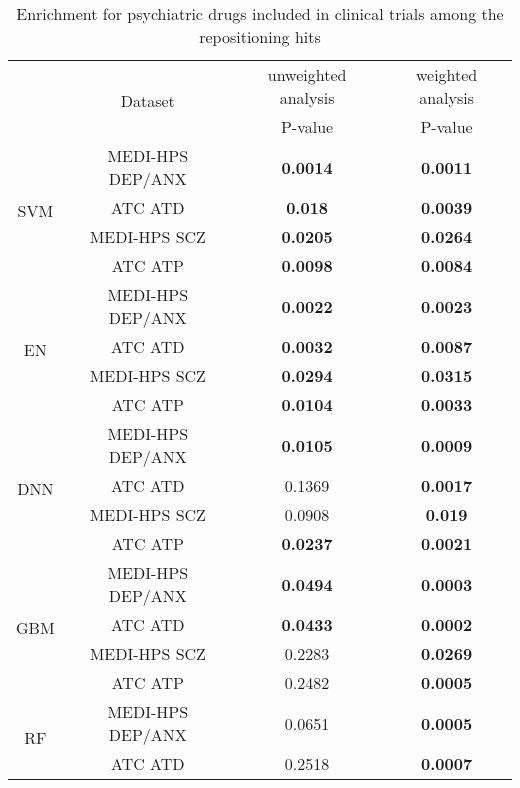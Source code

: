       \begin{table}[htbp]
        \centering
        \caption{Enrichment for psychiatric drugs included in clinical trials among the repositioning hits}
        \begin{threeparttable}
          \begin{tabular}{cccc}
          \toprule
                & \multirow{2}[4]{*}{Dataset} & unweighted analysis & weighted analysis \\
      \cmidrule{3-4}          &       & P-value & P-value \\
          \midrule
          \multirow{4}[1]{*}{SVM} & MEDI-HPS DEP/ANX & \textbf{0.0014} & \textbf{0.0011} \\
                & ATC ATD & \textbf{0.018} & \textbf{0.0039} \\
                & MEDI-HPS SCZ  & \textbf{0.0205} & \textbf{0.0264} \\
                & ATC ATP & \textbf{0.0098} & \textbf{0.0084} \\
          \midrule
          \multirow{4}[0]{*}{EN} & MEDI-HPS DEP/ANX & \textbf{0.0022} & \textbf{0.0023} \\
                & ATC ATD & \textbf{0.0032} & \textbf{0.0087} \\
                & MEDI-HPS SCZ  & \textbf{0.0294} & \textbf{0.0315} \\
                & ATC ATP & \textbf{0.0104} & \textbf{0.0033} \\
          \midrule
          \multirow{4}[0]{*}{DNN} & MEDI-HPS DEP/ANX & \textbf{0.0105} & \textbf{0.0009} \\
                & ATC ATD & 0.1369 & \textbf{0.0017} \\
                & MEDI-HPS SCZ  & 0.0908 & \textbf{0.019} \\
                & ATC ATP & \textbf{0.0237} & \textbf{0.0021} \\
          \midrule
          \multirow{4}[0]{*}{GBM} & MEDI-HPS DEP/ANX & \textbf{0.0494} & \textbf{0.0003} \\
                & ATC ATD & \textbf{0.0433} & \textbf{0.0002} \\
                & MEDI-HPS SCZ  & 0.2283 & \textbf{0.0269} \\
                & ATC ATP & 0.2482 & \textbf{0.0005} \\
          \midrule
          \multirow{4}[1]{*}{RF} & MEDI-HPS DEP/ANX & 0.0651 & \textbf{0.0005} \\
                & ATC ATD & 0.2518 & \textbf{0.0007} \\

\end{tabular}
\end{threeparttable}
\end{table}
